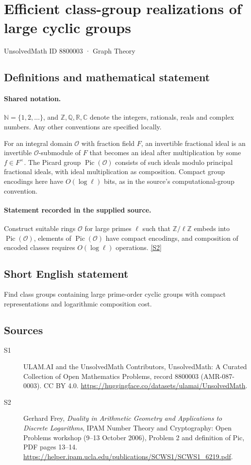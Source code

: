 \documentclass[11pt]{article}
\newcommand{\sref}[2]{\hyperlink{source:#1:#2}{[S#2]}}
\begin{document}
\setcounter{section}{8800002}
\section{Efficient class-group realizations of large cyclic groups}\label{8800003}
{\small\sffamily UnsolvedMath ID 8800003 · Graph Theory}
\subsection{Definitions and mathematical statement}

\paragraph{Shared notation.}$\mathbb N=\{1,2,\ldots\}$, and $\mathbb Z,\mathbb Q,\mathbb R,\mathbb C$ denote the integers, rationals, reals and complex numbers. Any other conventions are specified locally.


For an integral domain $\mathcal O$ with fraction field $F$, an invertible fractional ideal is an invertible $\mathcal O$-submodule of $F$ that becomes an ideal after multiplication by some $f\in F^\times$. The Picard group $\operatorname{Pic}(\mathcal O)$ consists of such ideals modulo principal fractional ideals, with ideal multiplication as composition. Compact group encodings here have $O(\log\ell)$ bits, as in the source's computational-group convention.
\paragraph{Statement recorded in the supplied source.}
Construct suitable rings $\mathcal O$ for large primes $\ell$ such that $\mathbb Z/\ell\mathbb Z$ embeds into $\operatorname{Pic}(\mathcal O)$, elements of $\operatorname{Pic}(\mathcal O)$ have compact encodings, and composition of encoded classes requires $O(\log\ell)$ operations. \sref{8800003}{2}

\subsection{Short English statement}
Find class groups containing large prime-order cyclic groups with compact representations and logarithmic composition cost.
\subsection{Sources}
\begin{description}
\item[\hypertarget{source:8800003:1}{S1}] ULAM.AI and the UnsolvedMath Contributors, UnsolvedMath: A Curated Collection of Open Mathematics Problems, record 8800003 (AMR-087-0003). CC BY 4.0. \url{https://huggingface.co/datasets/ulamai/UnsolvedMath}.
\item[\hypertarget{source:8800003:2}{S2}] Gerhard Frey, \emph{Duality in Arithmetic Geometry and Applications to Discrete Logarithms}, IPAM Number Theory and Cryptography: Open Problems workshop (9--13 October 2006), Problem 2 and definition of Pic, PDF pages 13--14. \url{https://helper.ipam.ucla.edu/publications/SCWS1/SCWS1_6219.pdf}.
\end{description}
\label{end:8800003}
\end{document}
